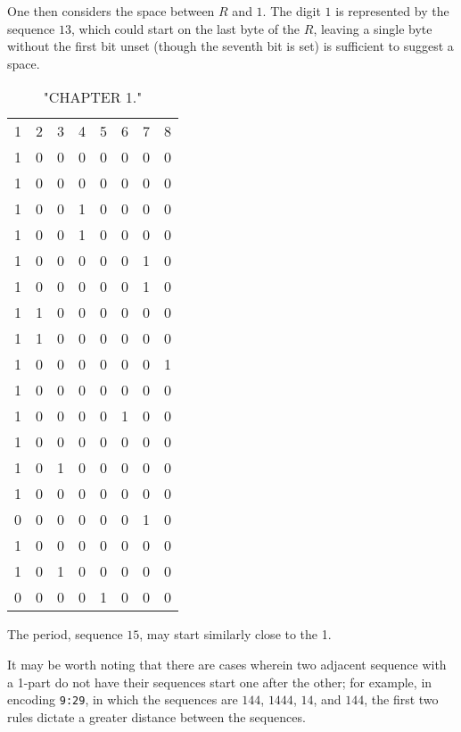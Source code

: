 \documentclass{article}
\begin{document}
One then considers the space between $R$ and $1$.  The digit $1$ is represented by the sequence $13$, which could start on the last byte of the $R$, leaving a single byte without the first bit unset (though the seventh bit is set) is sufficient to suggest a space.

\begin{table}
    \centering
    \begin{tabular}{cccccccc}
        1 & 2 & 3 & 4 & 5 & 6 & 7 & 8\\
        1 & 0 & 0 & 0 & 0 & 0 & 0 & 0\\
        1 & 0 & 0 & 0 & 0 & 0 & 0 & 0\\
        1 & 0 & 0 & 1 & 0 & 0 & 0 & 0\\
        1 & 0 & 0 & 1 & 0 & 0 & 0 & 0\\
        1 & 0 & 0 & 0 & 0 & 0 & 1 & 0\\
        1 & 0 & 0 & 0 & 0 & 0 & 1 & 0\\
        1 & 1 & 0 & 0 & 0 & 0 & 0 & 0\\
        1 & 1 & 0 & 0 & 0 & 0 & 0 & 0\\
        1 & 0 & 0 & 0 & 0 & 0 & 0 & 1\\
        1 & 0 & 0 & 0 & 0 & 0 & 0 & 0\\
        1 & 0 & 0 & 0 & 0 & 1 & 0 & 0\\
        1 & 0 & 0 & 0 & 0 & 0 & 0 & 0\\
        1 & 0 & 1 & 0 & 0 & 0 & 0 & 0\\
        1 & 0 & 0 & 0 & 0 & 0 & 0 & 0\\
        0 & 0 & 0 & 0 & 0 & 0 & 1 & 0\\
        1 & 0 & 0 & 0 & 0 & 0 & 0 & 0\\
        1 & 0 & 1 & 0 & 0 & 0 & 0 & 0\\
        0 & 0 & 0 & 0 & 1 & 0 & 0 & 0\\
    \end{tabular}
    \caption{"CHAPTER 1."}
    \label{tab:my_label}
\end{table}

The period, sequence $15$, may start similarly close to the 1.

It may be worth noting that there are cases wherein two adjacent sequence with a 1-part do not have their sequences start one after the other; for example, in encoding \verb|9:29|, in which the sequences are $144$, $1444$, $14$, and $144$, the first two rules dictate a greater distance between the sequences.
\end{document}
